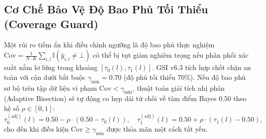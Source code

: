 \documentclass[10pt,a4paper,twoside]{article}
\begin{document}
\subsection{Cơ Chế Bảo Vệ Độ Bao Phủ Tối Thiểu (Coverage Guard)}
Một rủi ro tiềm ẩn khi điều chỉnh ngưỡng là độ bao phủ thực nghiệm $\text{Cov} = \frac{1}{N \cdot K} \sum_{i, l} \mathbb{I}(\hat{y}_{i, l} \neq \bot)$ có thể bị tụt giảm nghiêm trọng nếu phân phối xác suất nằm lơ lửng trong khoảng $[\tau_0(l), \tau_1(l)]$. GSI v6.3 tích hợp chốt chặn an toàn với cận dưới bắt buộc $\gamma_{\min} = 0.70$ (độ phủ tối thiểu 70\%). Nếu độ bao phủ sơ bộ trên tập dữ liệu vi phạm $\text{Cov} < \gamma_{\min}$, thuật toán giải tích nhị phân (Adaptive Bisection) sẽ tự động co hẹp dải từ chối về tâm điểm Bayes $0.50$ theo hệ số $\rho \in [0, 1]$:
\begin{equation}
\tau_0^{(\text{adj})}(l) = 0.50 - \rho \cdot (0.50 - \tau_0(l)), \quad \tau_1^{(\text{adj})}(l) = 0.50 + \rho \cdot (\tau_1(l) - 0.50),
\end{equation}
cho đến khi điều kiện $\text{Cov} \ge \gamma_{\min}$ được thỏa mãn một cách tất yếu.
\end{document}
